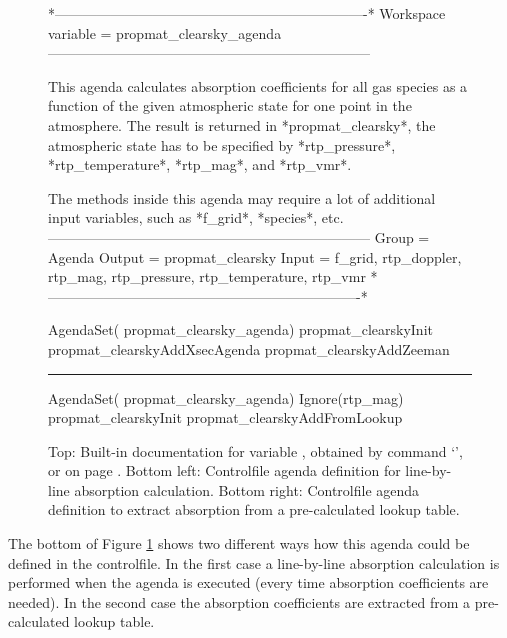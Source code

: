 \begin{figure}
\begin{code}
*-------------------------------------------------------------------*
Workspace variable = propmat_clearsky_agenda
---------------------------------------------------------------------

This agenda calculates absorption coefficients for all gas species
as a function of the given atmospheric state for one point in the
atmosphere. The result is returned in *propmat_clearsky*, the
atmospheric state has to be specified by *rtp_pressure*,
*rtp_temperature*, *rtp_mag*, and *rtp_vmr*.

The methods inside this agenda may require a lot of additional
input variables, such as *f_grid*, *species*, etc.
---------------------------------------------------------------------
Group  = Agenda
Output = propmat_clearsky
Input  = f_grid, rtp_doppler, rtp_mag, rtp_pressure,
         rtp_temperature, rtp_vmr
*-------------------------------------------------------------------*
\end{code}
\begin{minipage}[t]{0.48\hsize}
\begin{code}
AgendaSet(
propmat_clearsky_agenda)
{
  propmat_clearskyInit
  propmat_clearskyAddXsecAgenda
  propmat_clearskyAddZeeman
}
\end{code}
\end{minipage}
\hspace*{\fill}
\rule[-75pt]{.5pt}{85pt}
\hspace*{\fill}
\begin{minipage}[t]{0.48\hsize}
\begin{code}
AgendaSet(
propmat_clearsky_agenda)
{
  Ignore(rtp_mag)
  propmat_clearskyInit
  propmat_clearskyAddFromLookup
}
\end{code}
\end{minipage}
\caption{Top: Built-in documentation for variable
  , obtained by command
  `', or on page
  . Bottom
  left: Controlfile agenda definition for line-by-line absorption
  calculation. Bottom right: Controlfile agenda definition to extract
  absorption from a pre-calculated lookup table.}
\label{fig:agendas}
\end{figure}

The bottom of Figure \ref{fig:agendas} shows two different ways how this agenda
could be defined in the controlfile. In the first case a line-by-line
absorption calculation is performed when the agenda is executed (every time
absorption coefficients are needed). In the second case the absorption
coefficients are extracted from a pre-calculated lookup table.

